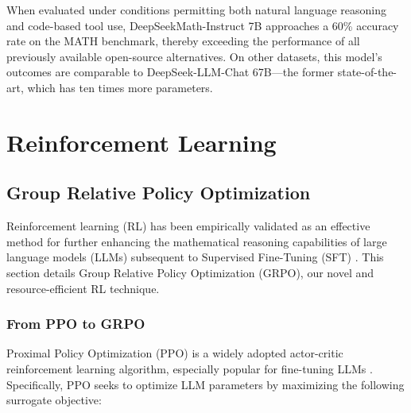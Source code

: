 When evaluated under conditions permitting both natural language reasoning and code-based tool use, DeepSeekMath-Instruct 7B approaches a 60\% accuracy rate on the MATH benchmark, thereby exceeding the performance of all previously available open-source alternatives. On other datasets, this model’s outcomes are comparable to DeepSeek-LLM-Chat 67B—the former state-of-the-art, which has ten times more parameters.

\section{Reinforcement Learning}

\subsection{Group Relative Policy Optimization} Reinforcement learning (RL) has been empirically validated as an effective method for further enhancing the mathematical reasoning capabilities of large language models (LLMs) subsequent to Supervised Fine-Tuning (SFT) \citep{wang2023math,wizardmath}. This section details Group Relative Policy Optimization (GRPO), our novel and resource-efficient RL technique.

\subsubsection{From PPO to GRPO} Proximal Policy Optimization (PPO) \citep{schulman2017proximal} is a widely adopted actor-critic reinforcement learning algorithm, especially popular for fine-tuning LLMs \citep{ouyang2022training}. Specifically, PPO seeks to optimize LLM parameters by maximizing the following surrogate objective:

